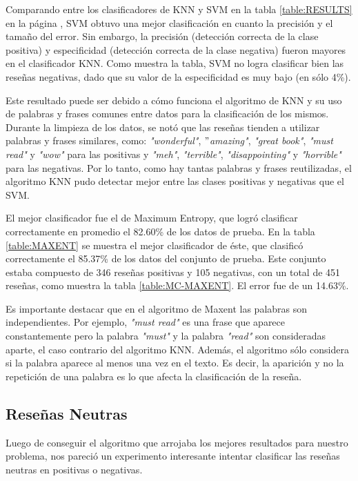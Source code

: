 \documentclass[hidelinks]{sig-alternate-05-2015}
\begin{document}
Comparando entre los clasificadores de KNN y SVM en la tabla \ref{table:RESULTS} en la página \pageref{table:RESULTS}, SVM obtuvo una mejor clasificación en cuanto la precisión y el tamaño del error. Sin embargo, la precisión (detección correcta de la clase positiva) y especificidad (detección correcta de la clase negativa) fueron mayores en el clasificador KNN. Como muestra la tabla, SVM no logra clasificar bien las reseñas negativas, dado que su valor de la especificidad es muy bajo (en sólo 4\%).  

Este resultado puede ser debido a cómo funciona el algoritmo de KNN y su uso de palabras y frases comunes entre datos para la clasificación de los mismos. Durante la limpieza de los datos, se notó que las reseñas tienden a utilizar palabras y frases similares, como: \textit{"wonderful"}, \textit{$"$amazing"}, \textit{"great book"}, \textit{"must read"} y \textit{"wow"} para las positivas y \textit{"meh"}, \textit{"terrible"}, \textit{"disappointing"} y \textit{"horrible"} para las negativas. Por lo tanto, como hay tantas palabras y frases reutilizadas, el algoritmo KNN pudo detectar mejor entre las clases positivas y negativas que el SVM. 

El mejor clasificador fue el de Maximum Entropy, que logró clasificar correctamente en promedio el 82.60\% de los datos de prueba. En la tabla \ref{table:MAXENT} se muestra el mejor clasificador de éste, que clasificó correctamente el 85.37\% de los datos del conjunto de prueba. Este conjunto estaba compuesto de 346 reseñas positivas y 105 negativas, con un total de 451 reseñas, como muestra la tabla \ref{table:MC-MAXENT}. El error fue de un 14.63\%.

Es importante destacar que en el algoritmo de Maxent las palabras son independientes. Por ejemplo, \textit{"must read"} es una frase que aparece constantemente pero la palabra \textit{"must"} y la palabra \textit{"read"} son consideradas aparte, el caso contrario del algoritmo KNN. Además, el algoritmo sólo considera si la palabra aparece al menos una vez en el texto. Es decir, la aparición y no la repetición de una palabra es lo que afecta la clasificación de la reseña. 

\subsection{Reseñas Neutras}

Luego de conseguir el algoritmo que arrojaba los mejores resultados para nuestro problema, nos pareció un experimento interesante intentar clasificar las reseñas neutras en positivas o negativas.
\end{document}

